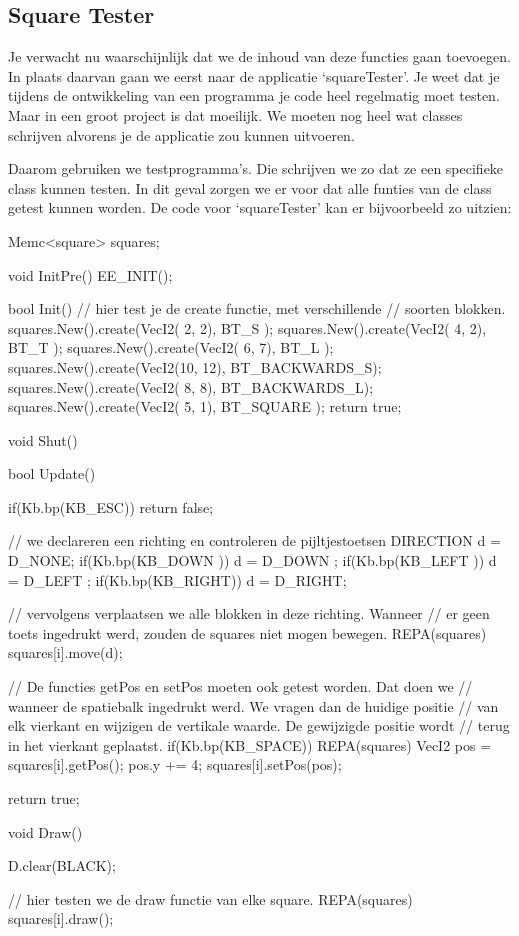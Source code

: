 \subsection{Square Tester}
Je verwacht nu waarschijnlijk dat we de inhoud van deze functies gaan toevoegen. In plaats daarvan gaan we eerst naar de applicatie `squareTester'. Je weet dat je tijdens de ontwikkeling van een programma je code heel regelmatig moet testen. Maar in een groot project is dat moeilijk. We moeten nog heel wat classes schrijven alvorens je de applicatie zou kunnen uitvoeren.

Daarom gebruiken we testprogramma's. Die schrijven we zo dat ze een specifieke class kunnen testen. In dit geval zorgen we er voor dat alle funties van de class  getest kunnen worden. De code voor `squareTester' kan er bijvoorbeeld zo uitzien:

\begin{code}

Memc<square> squares;

void InitPre()
{
   EE_INIT();
}                
       
bool Init()
{   
	 // hier test je de create functie, met verschillende
	 // soorten blokken.
   squares.New().create(VecI2( 2,  2), BT_S          );
   squares.New().create(VecI2( 4,  2), BT_T          );
   squares.New().create(VecI2( 6,  7), BT_L          );
   squares.New().create(VecI2(10, 12), BT_BACKWARDS_S);
   squares.New().create(VecI2( 8,  8), BT_BACKWARDS_L);
   squares.New().create(VecI2( 5,  1), BT_SQUARE     );
	 return true;
}

void Shut() {}

bool Update()
{
   if(Kb.bp(KB_ESC)) return false;
   
	 // we declareren een richting en controleren de pijltjestoetsen
   DIRECTION d = D_NONE;
   if(Kb.bp(KB_DOWN )) d = D_DOWN ;
   if(Kb.bp(KB_LEFT )) d = D_LEFT ;
   if(Kb.bp(KB_RIGHT)) d = D_RIGHT;
   
	 // vervolgens verplaatsen we alle blokken in deze richting. Wanneer
	 // er geen toets ingedrukt werd, zouden de squares niet mogen bewegen.
   REPA(squares)
   {
      squares[i].move(d);
   }
   
	 // De functies getPos en setPos moeten ook getest worden. Dat doen we
	 // wanneer de spatiebalk ingedrukt werd. We vragen dan de huidige positie
	 // van elk vierkant en wijzigen de vertikale waarde. De gewijzigde positie wordt
	 // terug in het vierkant geplaatst.
   if(Kb.bp(KB_SPACE))
   {
      REPA(squares)
      {
         VecI2 pos = squares[i].getPos();
         pos.y += 4;
         squares[i].setPos(pos);
      }
   }
   
   return true;
}

void Draw()
{
   D.clear(BLACK);
	
	 // hier testen we de draw functie van elke square.
   REPA(squares)
   {
      squares[i].draw();
   }
}

\end{code}

